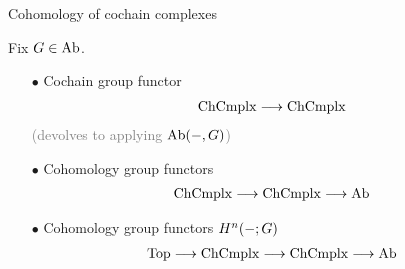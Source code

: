 \begin{frame}[t]{Cohomology of cochain complexes} %

  \par Fix $G \in \mathrm{Ab}$.
  \vspace{\baselineskip}
  \begin{itemize}[nosep]
    \pause
    \item[$\bullet$] {
      Cochain group functor
      \vspace{-0.5 \baselineskip}
      \begin{align*}
        \mathrm{ChCmplx} \longrightarrow \mathrm{ChCmplx}
      \end{align*}
      \vspace{-0.5 \baselineskip}
      \textcolor{gray}{(devolves to applying $\mathrm{Ab}({-}, G)$)}
      \vspace{\baselineskip}
    }
    \pause
    \item[$\bullet$] {
      Cohomology group functors
      \vspace{-0.5 \baselineskip}
      \begin{align*}
        \mathrm{ChCmplx} \longrightarrow \mathrm{ChCmplx} \longrightarrow \mathrm{Ab}
      \end{align*}
      \vspace{-\baselineskip}
    }
    \pause
    \item[$\bullet$] {
      Cohomology group functors $H^n ({-} ; G)$
      \vspace{-0.5 \baselineskip}
      \begin{align*}
        \mathrm{Top} \longrightarrow \mathrm{ChCmplx} \longrightarrow \mathrm{ChCmplx} \longrightarrow \mathrm{Ab}
      \end{align*}
    }
  \end{itemize}
  
\end{frame}


  

  
